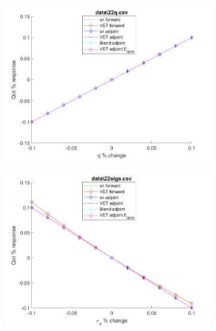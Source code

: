 \documentclass[12pt]{report}
\begin{document}
\begin{figure}[H]
\label{Trial1}
\centering
\begin{subfigure}{.5\textwidth}
  \centering
  \includegraphics[width=.98\linewidth]{figures2/22qSens.png}
  \label{T1:sfig1}
\end{subfigure}%
\begin{subfigure}{.5\textwidth}
  \centering
  \includegraphics[width=.98\linewidth]{figures2/22sigaSens.png}
  \label{T1:sfig2}
\end{subfigure}
%
\begin{subfigure}{.5\textwidth}
  \centering

\end{subfigure}
\end{figure}
\end{document}
